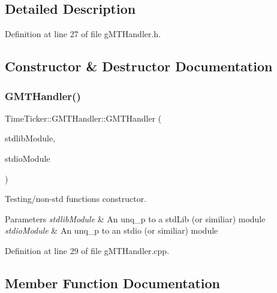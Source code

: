 \subsection{Detailed Description}


Definition at line 27 of file g\+M\+T\+Handler.\+h.



\subsection{Constructor \& Destructor Documentation}
\mbox{\label{classTimeTicker_1_1GMTHandler_a6deaf65737b34b1ed1c12e4c7ea33f4b}} 
\subsubsection{\texorpdfstring{GMTHandler()}{GMTHandler()}}
{\footnotesize\ttfamily Time\+Ticker\+::\+G\+M\+T\+Handler\+::\+G\+M\+T\+Handler (\begin{DoxyParamCaption}\item[{std\+::unique\+\_\+ptr$<$ \mbox{\hyperlink{classcFunctions_1_1cStdLib}{c\+Functions\+::c\+Std\+Lib}} $>$}]{stdlib\+Module,  }\item[{std\+::unique\+\_\+ptr$<$ \mbox{\hyperlink{classcFunctions_1_1cStdio}{c\+Functions\+::c\+Stdio}} $>$}]{stdio\+Module }\end{DoxyParamCaption})}



Testing/non-\/std functions constructor. 


\begin{DoxyParams}{Parameters}
{\em stdlib\+Module} & An unq\+\_\+p to a std\+Lib (or similiar) module \\
\hline
{\em stdio\+Module} & An unq\+\_\+p to an stdio (or similiar) module \\
\hline
\end{DoxyParams}


Definition at line 29 of file g\+M\+T\+Handler.\+cpp.



\subsection{Member Function Documentation}
\mbox{\label{classTimeTicker_1_1GMTHandler_ad5732f5089f4fb8df8720995cdc930d7}} 

